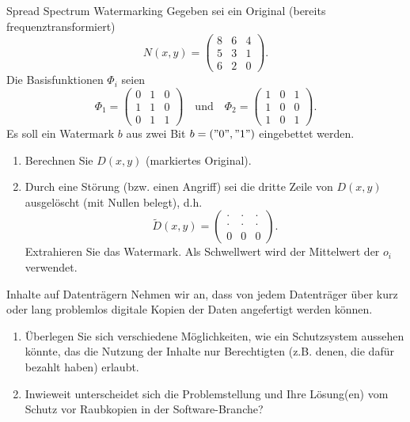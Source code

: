 \documentclass{article}
\author{Leopold Lemmermann}
\begin{document}
\createtitle



\setcounter{section}{20}
\begin{exercise}[3]{Spread Spectrum Watermarking}
  Gegeben sei ein Original (bereits frequenztransformiert)
  \[
    N(x,y)=\begin{pmatrix} 8 & 6 & 4 \\ 5 & 3 & 1\\ 6 & 2 & 0 \end{pmatrix}.
  \]
  Die Basisfunktionen $\Phi_i$ seien
  \[
    \Phi_1=\begin{pmatrix} 0 & 1 & 0 \\ 1 & 1 & 0 \\ 0 & 1 & 1 \end{pmatrix} \quad \text{und} \quad \Phi_2=\begin{pmatrix} 1 & 0 & 1 \\ 1 & 0 & 0 \\ 1 & 0 & 1 \end{pmatrix}.
  \]
  Es soll ein Watermark $b$ aus zwei Bit $b = ("0","1")$ eingebettet werden.

  \begin{enumerate}
    \item Berechnen Sie $D(x,y)$ (markiertes Original).
    \item Durch eine Störung (bzw. einen Angriff) sei die dritte Zeile von $D(x,y)$ ausgelöscht (mit Nullen belegt), d.h.
          \[
            \tilde{D}(x,y)=\begin{pmatrix} \cdot & \cdot & \cdot \\ \cdot & \cdot & \cdot \\ 0 & 0 & 0 \end{pmatrix}.
          \]
          Extrahieren Sie das Watermark. Als Schwellwert wird der Mittelwert der $o_i$ verwendet.
  \end{enumerate}
\end{exercise}

\setcounter{section}{25}
\begin{exercise}[1]{Inhalte auf Datenträgern}
  Nehmen wir an, dass von jedem Datenträger über kurz oder lang problemlos digitale Kopien der Daten angefertigt werden können.
  \begin{enumerate}
    \item Überlegen Sie sich verschiedene Möglichkeiten, wie ein Schutzsystem aussehen könnte, das die Nutzung der Inhalte nur Berechtigten (z.B. denen, die dafür bezahlt haben) erlaubt.
    \item Inwieweit unterscheidet sich die Problemstellung und Ihre Lösung(en) vom Schutz vor Raubkopien in der Software-Branche?
  \end{enumerate}
\end{exercise}
\end{document}
